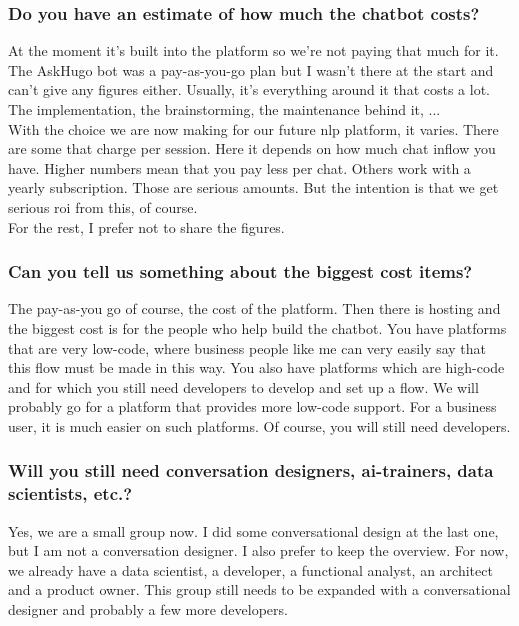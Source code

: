 \begin{appendices}
	\subsubsection{Do you have an estimate of how much the chatbot costs?}
	At the moment it's built into the platform so we're not paying that much for it. The AskHugo bot was a pay-as-you-go plan but I wasn't there at the start and can't give any figures either. Usually, it's everything around it that costs a lot. The implementation, the brainstorming, the maintenance behind it, ... \\
	With the choice we are now making for our future \acrshort{nlp} platform, it varies. There are some that charge per session. Here it depends on how much chat inflow you have. Higher numbers mean that you pay less per chat.
	Others work with a yearly subscription. Those are serious amounts. But the intention is that we get serious \acrshort{roi} from this, of course.\\
	For the rest, I prefer not to share the figures.
	
	\subsubsection{Can you tell us something about the biggest cost items?}
	The pay-as-you go of course, the cost of the platform. Then there is hosting and the biggest cost is for the people who help build the chatbot. You have platforms that are very low-code, where business people like me can very easily say that this flow must be made in this way. You also have platforms which are high-code and for which you still need developers to develop and set up a flow. We will probably go for a platform that provides more low-code support. For a business user, it is much easier on such platforms. Of course, you will still need developers.
	
	\subsubsection{Will you still need conversation designers, \acrshort{ai}-trainers, data scientists, etc.?}
	Yes, we are a small group now. I did some conversational design at the last one, but I am not a conversation designer. I also prefer to keep the overview. For now, we already have a data scientist, a developer, a functional analyst, an architect and a product owner. This group still needs to be expanded with a conversational designer and probably a few more developers.
	

\end{appendices}
